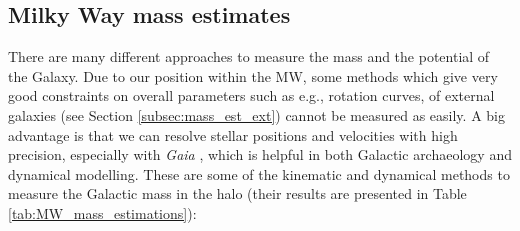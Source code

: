 \subsection{Milky Way mass estimates}\label{subsec:mass_est_MW}
There are many different approaches to measure the mass and the potential of the Galaxy. Due to our position within the \ac{MW}, some methods which give very good constraints on overall parameters such as e.g., rotation curves, of external galaxies (see Section \ref{subsec:mass_est_ext}) cannot be measured as easily. A big advantage is that we can resolve stellar positions and velocities with high precision, especially with \textit{Gaia} \citep{Gaia...mission...2016, GaiaDR2...overview...2018, GaiaDR...GCs...2018}, which is helpful in both Galactic archaeology and dynamical modelling. These are some of the kinematic and dynamical methods to measure the Galactic mass in the halo (their results are presented in Table \ref{tab:MW_mass_estimations}):
